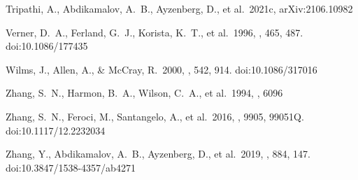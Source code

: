 \documentclass[twocolumn]{emulateapj}
\begin{document}
\begin{thebibliography}{99}
 Tripathi, A., Abdikamalov, A.~B., Ayzenberg, D., et al.\ 2021c, arXiv:2106.10982

 Verner, D.~A., Ferland, G.~J., Korista, K.~T., et al.\ 1996, \apj, 465, 487. doi:10.1086/177435

 Wilms, J., Allen, A., \& McCray, R.\ 2000, \apj, 542, 914. doi:10.1086/317016 

 Zhang, S.~N., Harmon, B.~A., Wilson, C.~A., et al.\ 1994, \iaucirc, 6096

 Zhang, S.~N., Feroci, M., Santangelo, A., et al.\ 2016, \procspie, 9905, 99051Q. doi:10.1117/12.2232034

 Zhang, Y., Abdikamalov, A.~B., Ayzenberg, D., et al.\ 2019, \apj, 884, 147. doi:10.3847/1538-4357/ab4271

\end{thebibliography}
\end{document}
